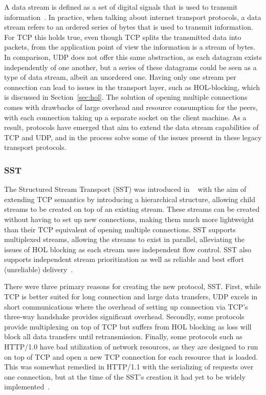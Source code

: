 \documentclass[english, 12pt, a4paper, elec, utf8, a-2b, online]{aaltothesis}
\begin{document}
A data stream is defined as a set of digital signals that is used to transmit
information~\cite{data_stream}. In practice, when talking about internet
transport protocols, a data stream refers to an ordered series of bytes that is
used to transmit information. For TCP this holds true, even though TCP splits
the transmitted data into packets, from the application point of view the
information is a stream of bytes. In comparison, UDP does not offer this same
abstraction, as each datagram exists independently of one another, but a series
of these datagrams could be seen as a type of data stream, albeit an unordered one.
Having only one stream per connection can lead to issues in the transport layer, such as HOL-blocking,
which is discussed in Section~\ref{sec:hol}. The solution of opening multiple
connections comes with drawbacks of large overhead and resource consumption for
the peers, with each connection taking up a separate socket on the client machine.
As a result, protocols have emerged that aim to extend the data stream capabilities
of TCP and UDP, and in the process solve some of the issues present in these legacy
transport protocols.

\subsubsection{SST}

The Structured Stream Transport (SST) was introduced in ~\cite{sst} with the aim
of extending TCP semantics by introducing a hierarchical structure, allowing
child streams to be created on top of an existing stream. These streams can
be created without having to set up new connections, making them much more lightweight
than their TCP equivalent of opening multiple connections. SST supports multiplexed streams, allowing the streams
to exist in parallel, alleviating the issues of HOL blocking as each stream uses
independent flow control. SST also supports independent stream prioritization
as well as reliable and best effort (unreliable) delivery~\cite{sst}.

There were three primary reasons for creating the new protocol, SST. First, while
TCP is better suited for long connection and large data transfers, UDP excels
in short communications where the overhead of setting up connection via TCP's three-way
handshake provides significant overhead. Secondly, some protocols provide
multiplexing on top of TCP but suffers from HOL blocking as loss will block all
data transfers until retransmission. Finally, some protocols such as HTTP/1.0
have bad utilization of network resources, as they are designed to run on top of TCP
and open a new TCP connection for each resource that is loaded. This
was somewhat remedied in HTTP/1.1 with the serializing of requests over one connection,
but at the time of the SST's creation it had yet to be widely implemented~\cite{sst}.
\end{document}
